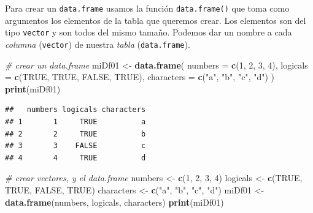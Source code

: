 \documentclass[
]{book}
\newenvironment{Shaded}{\begin{snugshade}}{\end{snugshade}}
\newcommand{\CommentTok}[1]{\textcolor[rgb]{0.56,0.35,0.01}{\textit{#1}}}
\newcommand{\DataTypeTok}[1]{\textcolor[rgb]{0.13,0.29,0.53}{#1}}
\newcommand{\DecValTok}[1]{\textcolor[rgb]{0.00,0.00,0.81}{#1}}
\newcommand{\KeywordTok}[1]{\textcolor[rgb]{0.13,0.29,0.53}{\textbf{#1}}}
\newcommand{\NormalTok}[1]{#1}
\newcommand{\OtherTok}[1]{\textcolor[rgb]{0.56,0.35,0.01}{#1}}
\newcommand{\StringTok}[1]{\textcolor[rgb]{0.31,0.60,0.02}{#1}}
\begin{document}
Para crear un \texttt{data.frame} usamos la función \texttt{data.frame()} que toma como argumentos los elementos de la tabla que queremos crear. Los elementos son del tipo \texttt{vector} y son todos del mismo tamaño. Podemos dar un nombre a cada \emph{columna} (\texttt{vector}) de nuestra \emph{tabla} (\texttt{data.frame}).

\begin{Shaded}
\begin{Highlighting}[]
\CommentTok{# crear un data.frame }
\NormalTok{miDf01 <-}\StringTok{ }\KeywordTok{data.frame}\NormalTok{(}
  \DataTypeTok{numbers =} \KeywordTok{c}\NormalTok{(}\DecValTok{1}\NormalTok{, }\DecValTok{2}\NormalTok{, }\DecValTok{3}\NormalTok{, }\DecValTok{4}\NormalTok{), }
  \DataTypeTok{logicals =} \KeywordTok{c}\NormalTok{(}\OtherTok{TRUE}\NormalTok{, }\OtherTok{TRUE}\NormalTok{, }\OtherTok{FALSE}\NormalTok{, }\OtherTok{TRUE}\NormalTok{), }
  \DataTypeTok{characters =} \KeywordTok{c}\NormalTok{(}\StringTok{"a"}\NormalTok{, }\StringTok{"b"}\NormalTok{, }\StringTok{"c"}\NormalTok{, }\StringTok{"d"}\NormalTok{)}
\NormalTok{)}
\KeywordTok{print}\NormalTok{(miDf01)}
\end{Highlighting}
\end{Shaded}

\begin{verbatim}
##   numbers logicals characters
## 1       1     TRUE          a
## 2       2     TRUE          b
## 3       3    FALSE          c
## 4       4     TRUE          d
\end{verbatim}

\begin{Shaded}
\begin{Highlighting}[]
\CommentTok{# crear vectores, y el data.frame}
\NormalTok{numbers <-}\StringTok{ }\KeywordTok{c}\NormalTok{(}\DecValTok{1}\NormalTok{, }\DecValTok{2}\NormalTok{, }\DecValTok{3}\NormalTok{, }\DecValTok{4}\NormalTok{)}
\NormalTok{logicals <-}\StringTok{ }\KeywordTok{c}\NormalTok{(}\OtherTok{TRUE}\NormalTok{, }\OtherTok{TRUE}\NormalTok{, }\OtherTok{FALSE}\NormalTok{, }\OtherTok{TRUE}\NormalTok{)}
\NormalTok{characters <-}\StringTok{ }\KeywordTok{c}\NormalTok{(}\StringTok{"a"}\NormalTok{, }\StringTok{"b"}\NormalTok{, }\StringTok{"c"}\NormalTok{, }\StringTok{"d"}\NormalTok{)}
\NormalTok{miDf01 <-}\StringTok{ }\KeywordTok{data.frame}\NormalTok{(numbers, logicals, characters)}
\KeywordTok{print}\NormalTok{(miDf01)}
\end{Highlighting}
\end{Shaded}
\end{document}
